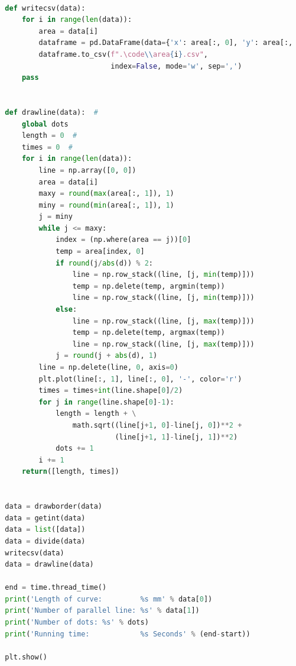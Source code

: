 \documentclass{apmcmthesis}
\begin{document}
\begin{lstlisting}[language=Python,caption={The python Source code of contour parallel hatch}]
  
  def writecsv(data):
      for i in range(len(data)):
          area = data[i]
          dataframe = pd.DataFrame(data={'x': area[:, 0], 'y': area[:, 1]})
          dataframe.to_csv(f".\code\\area{i}.csv",
                           index=False, mode='w', sep=',')
      pass
  
  
  def drawline(data):  # 
      global dots
      length = 0  # 
      times = 0  # 
      for i in range(len(data)):
          line = np.array([0, 0])
          area = data[i]
          maxy = round(max(area[:, 1]), 1)
          miny = round(min(area[:, 1]), 1)
          j = miny
          while j <= maxy:
              index = (np.where(area == j))[0]
              temp = area[index, 0]
              if round(j/abs(d)) % 2:
                  line = np.row_stack((line, [j, min(temp)]))
                  temp = np.delete(temp, argmin(temp))
                  line = np.row_stack((line, [j, min(temp)]))
              else:
                  line = np.row_stack((line, [j, max(temp)]))
                  temp = np.delete(temp, argmax(temp))
                  line = np.row_stack((line, [j, max(temp)]))
              j = round(j + abs(d), 1)
          line = np.delete(line, 0, axis=0)
          plt.plot(line[:, 1], line[:, 0], '-', color='r')
          times = times+int(line.shape[0]/2)
          for j in range(line.shape[0]-1):
              length = length + \
                  math.sqrt((line[j+1, 0]-line[j, 0])**2 +
                            (line[j+1, 1]-line[j, 1])**2)
              dots += 1
          i += 1
      return([length, times])
  
  
  data = drawborder(data)
  data = getint(data)
  data = list([data])
  data = divide(data)
  writecsv(data)
  data = drawline(data)
  
  end = time.thread_time()
  print('Length of curve:         %s mm' % data[0])
  print('Number of parallel line: %s' % data[1])
  print('Number of dots: %s' % dots)
  print('Running time:            %s Seconds' % (end-start))
  
  plt.show()
  
\end{lstlisting}
\end{document}
